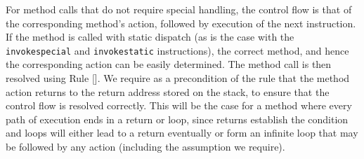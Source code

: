 For method calls that do not require special handling, the control
flow is that of the corresponding method's action, followed by
execution of the next instruction.
If the method is called with static dispatch (as is the case with the
\texttt{invokespecial} and \texttt{invokestatic} instructions), the
correct method, and hence the corresponding action can be easily
determined.
The method call is then resolved using
Rule [].
We require as a precondition of the rule that the method action
returns to the return address stored on the stack, to ensure that the
control flow is resolved correctly.
This will be the case for a method where every path of execution ends
in a return or loop, since returns establish the condition and loops
will either lead to a return eventually or form an infinite loop that
may be followed by any action (including the assumption we require).
%
